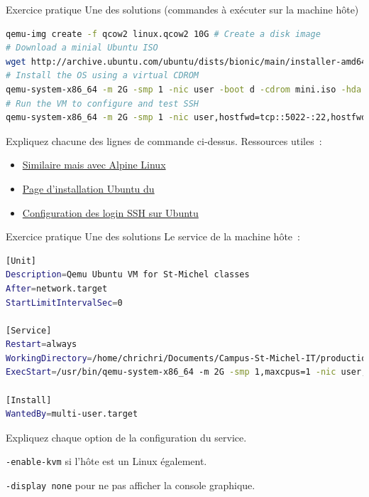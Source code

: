 \documentclass{beamer}
\begin{document}
    \begin{frame}[fragile]{Exercice pratique \execcounterdispinc{}}{Une des solutions (commandes à exécuter sur la machine hôte)}
        \begin{lstlisting}[language=bash]
qemu-img create -f qcow2 linux.qcow2 10G # Create a disk image
# Download a minial Ubuntu ISO
wget http://archive.ubuntu.com/ubuntu/dists/bionic/main/installer-amd64/current/images/netboot/mini.iso
# Install the OS using a virtual CDROM
qemu-system-x86_64 -m 2G -smp 1 -nic user -boot d -cdrom mini.iso -hda linux.qcow2 -k fr -enable-kvm
# Run the VM to configure and test SSH
qemu-system-x86_64 -m 2G -smp 1 -nic user,hostfwd=tcp::5022-:22,hostfwd=tcp::5080-:80 -display none -hda linux.qcow2 -k fr -enable-kvm
        \end{lstlisting}
        Expliquez chacune des lignes de commande ci-dessus.
        \bigbreak
        Ressources utiles~:
        \begin{itemize}
            \item \href{https://wiki.alpinelinux.org/wiki/Install_Alpine_in_QEMU}{Similaire mais avec Alpine Linux}
            \item \href{https://help.ubuntu.com/community/Installation/MinimalCD\#A64-bit_PC_.28amd64.2C_x86_64.29_.28Recommended.29}{Page d'installation Ubuntu du  }
            \item \href{https://phoenixnap.com/kb/generate-setup-ssh-key-ubuntu}{Configuration des login SSH sur Ubuntu}
        \end{itemize}
    \end{frame}

    \begin{frame}[fragile]{Exercice pratique \execcounterdispinc{}}{Une des solutions}
        Le service de la machine hôte~:
        \begin{lstlisting}[language=bash]
[Unit]
Description=Qemu Ubuntu VM for St-Michel classes
After=network.target
StartLimitIntervalSec=0

[Service]
Restart=always
WorkingDirectory=/home/chrichri/Documents/Campus-St-Michel-IT/production-deployment
ExecStart=/usr/bin/qemu-system-x86_64 -m 2G -smp 1,maxcpus=1 -nic user,hostfwd=tcp::5022-:22,hostfwd=tcp::5080-:8080 -display none -hda linux.qcow2 -k fr -enable-kvm

[Install]
WantedBy=multi-user.target
        \end{lstlisting}
        Expliquez chaque option de la configuration du service.
        \pause
        \begin{dangercolorbox}
            \lstinline{-enable-kvm} si l'hôte est un Linux également.

            \lstinline{-display none} pour ne pas afficher la console graphique.
        \end{dangercolorbox}
    \end{frame}
\end{document}
